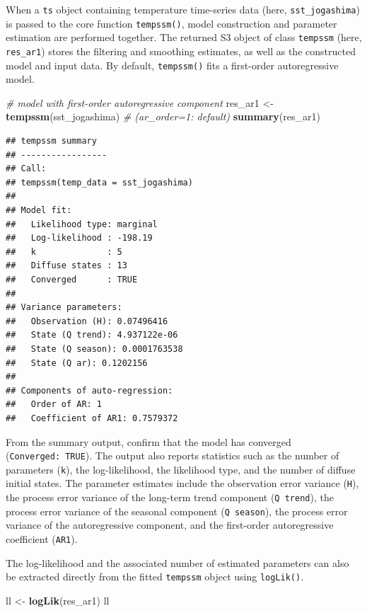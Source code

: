 \documentclass[
]{article}
\newenvironment{Shaded}{\begin{snugshade}}{\end{snugshade}}
\newcommand{\CommentTok}[1]{\textcolor[rgb]{0.56,0.35,0.01}{\textit{#1}}}
\newcommand{\FunctionTok}[1]{\textcolor[rgb]{0.13,0.29,0.53}{\textbf{#1}}}
\newcommand{\NormalTok}[1]{#1}
\newcommand{\OtherTok}[1]{\textcolor[rgb]{0.56,0.35,0.01}{#1}}
\begin{document}
When a \texttt{ts} object containing temperature time-series data (here,
\texttt{sst\_jogashima}) is passed to the core function
\texttt{tempssm()}, model construction and parameter estimation are
performed together. The returned S3 object of class \texttt{tempssm}
(here, \texttt{res\_ar1}) stores the filtering and smoothing estimates,
as well as the constructed model and input data. By default,
\texttt{tempssm()} fits a first-order autoregressive model.

\begin{Shaded}
\begin{Highlighting}[]
\CommentTok{\# model with first{-}order autoregressive component}
\NormalTok{res\_ar1 }\OtherTok{\textless{}{-}} \FunctionTok{tempssm}\NormalTok{(sst\_jogashima) }\CommentTok{\# (ar\_order=1: default)}
\FunctionTok{summary}\NormalTok{(res\_ar1)}
\end{Highlighting}
\end{Shaded}

\begin{verbatim}
## tempssm summary
## -----------------
## Call:
## tempssm(temp_data = sst_jogashima)
## 
## Model fit:
##   Likelihood type: marginal 
##   Log-likelihood : -198.19 
##   k              : 5 
##   Diffuse states : 13 
##   Converged      : TRUE 
## 
## Variance parameters:
##   Observation (H): 0.07496416 
##   State (Q trend): 4.937122e-06 
##   State (Q season): 0.0001763538 
##   State (Q ar): 0.1202156 
## 
## Components of auto-regression:
##   Order of AR: 1 
##   Coefficient of AR1: 0.7579372
\end{verbatim}

From the summary output, confirm that the model has converged
(\texttt{Converged:\ TRUE}). The output also reports statistics such as
the number of parameters (\texttt{k}), the log-likelihood, the
likelihood type, and the number of diffuse initial states. The parameter
estimates include the observation error variance (\texttt{H}), the
process error variance of the long-term trend component
(\texttt{Q\ trend}), the process error variance of the seasonal
component (\texttt{Q\ season}), the process error variance of the
autoregressive component, and the first-order autoregressive coefficient
(\texttt{AR1}).

The log-likelihood and the associated number of estimated parameters can
also be extracted directly from the fitted \texttt{tempssm} object using
\texttt{logLik()}.

\begin{Shaded}
\begin{Highlighting}[]
\NormalTok{ll }\OtherTok{\textless{}{-}} \FunctionTok{logLik}\NormalTok{(res\_ar1)}
\NormalTok{ll}
\end{Highlighting}
\end{Shaded}
\end{document}
